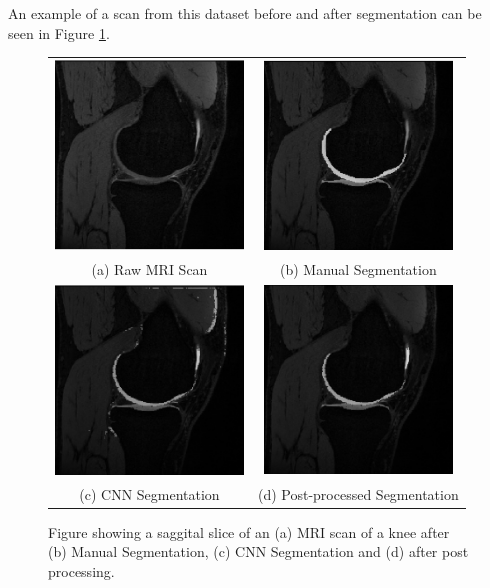 \documentclass[11pt,a4paper]{memoir}
\numberwithin{figure}{section}
\numberwithin{table}{section}
\numberwithin{equation}{section}
\begin{document}
An example of a scan from this dataset before and after segmentation can be seen in Figure \ref{challll}. 

\begin{figure}[!ht]
\centering
\begin{tabular}{cc}

\includegraphics[width=5cm]{rawchal.jpeg} & \includegraphics[width=5cm]{challab.jpeg} \\
(a) Raw MRI Scan &  (b) Manual Segmentation\\
\includegraphics[width=5cm]{segchal.jpeg} & \includegraphics[width=5cm]{segpostchal.jpeg}\\
(c) CNN Segmentation &  (d) Post-processed Segmentation\\

  
\end{tabular}
\caption[An example of an image before and after segmentation and post-processing for the Segmentation Challenge data]{Figure showing a saggital slice of an (a) MRI scan of a knee after (b) Manual Segmentation, (c) CNN Segmentation and (d) after post processing.}
\label{challll}
\end{figure}
\end{document}
